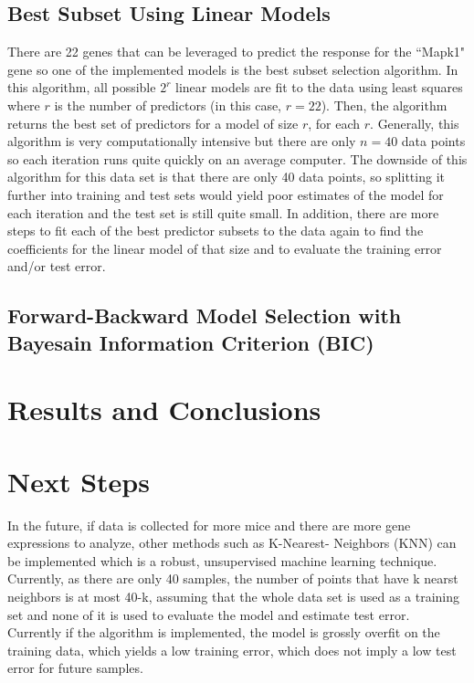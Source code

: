 \documentclass[letterpaper]{article}
\begin{document}
\subsection{Best Subset Using Linear Models}
There are 22 genes that can be leveraged to predict the response for the ``Mapk1" gene so one of the implemented models is the best subset selection algorithm.  In this algorithm, all possible $2^r$ linear models are fit to the data using least squares where $r$ is the number of predictors (in this case, $r=22$).  Then, the algorithm returns the best set of predictors for a model of size $r$, for each $r$.  Generally, this algorithm is very computationally intensive but there are only $n=40$ data points so each iteration runs quite quickly on an average computer.  The downside of this algorithm for this data set is that there are only 40 data points, so splitting it further into training and test sets would yield poor estimates of the model for each iteration and the test set is still quite small.  In addition, there are more steps to fit each of the best predictor subsets to the data again to find the coefficients for the linear model of that size and to evaluate the training error and/or test error.

\subsection{Forward-Backward Model Selection with Bayesain Information Criterion (BIC)}

\section{Results and Conclusions}

\section{Next Steps}
In the future, if data is collected for more mice and there are more gene expressions to analyze, other methods such as K-Nearest-
Neighbors (KNN) can be implemented which is a robust, unsupervised machine learning technique.  Currently, as there are only 40 
samples, the number of points that have k nearst neighbors is at most 40-k, assuming that the whole data set is used as a training 
set and none of it is used to evaluate the model and estimate test error.  Currently if the algorithm is implemented, the 
model is grossly overfit on the training data, which yields a low training error, which does not imply a low test error for future samples.
\end{document}
